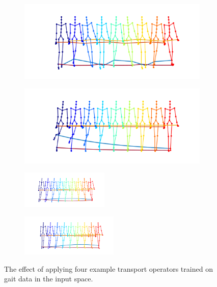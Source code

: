 \documentclass[letterpaper]{article} %
\begin{document}
\begin{figure}[ht]

\centering
\begin{subfigure}[b]{0.62\columnwidth}
\centering
{\includegraphics[width=0.99\columnwidth]{gaitTransOpt_1.png}}
\caption{}
\label{subfig:inputGait1}
\end{subfigure}
\vspace{-2.42mm}
\begin{subfigure}[b]{0.62\columnwidth}
\centering
{\includegraphics[width=0.99\columnwidth]{gaitTransOpt_2.png}}
\caption{}
\label{subfig:inputGait2}
\end{subfigure}
\begin{subfigure}[b]{0.62\columnwidth}
\centering
\includegraphics[width=0.8019000000000001\columnwidth,height=0.7in ]{gaitTransOpt_4.png}
\caption{}
\label{subfig:inputGait4}
\end{subfigure}
\begin{subfigure}[b]{0.62\columnwidth}
\centering
\includegraphics[width=0.891\columnwidth,height=0.78in ]{gaitTransOpt_8.png}
\caption{}
\label{subfig:inputGait8}
\end{subfigure}




\caption{\label{fig:inputGait} The effect of applying four example transport operators trained on gait data in the input space. }

\end{figure}
\end{document}
